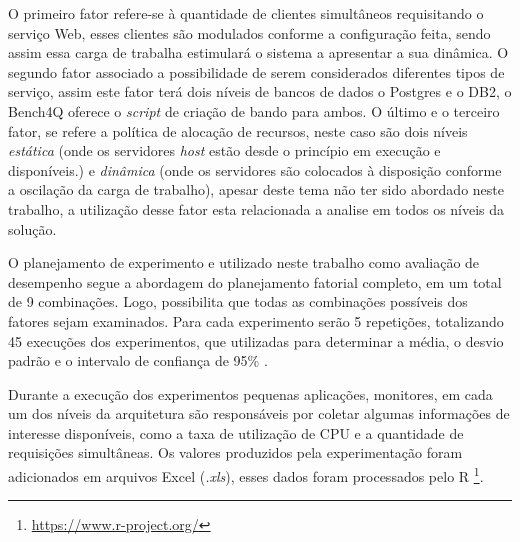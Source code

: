 O primeiro fator refere-se à quantidade de clientes simultâneos requisitando o serviço Web, esses clientes são modulados conforme a configuração feita, sendo assim essa carga de trabalha estimulará o sistema a apresentar a sua dinâmica. O segundo fator associado a possibilidade de serem considerados diferentes tipos de serviço, assim este fator terá dois níveis de bancos de dados o Postgres e o DB2, o Bench4Q oferece o \textit{script} de criação de bando para ambos. O último e o terceiro fator, se refere a política de alocação de recursos, neste caso são dois níveis \textit{estática} (onde os servidores \textit{host} estão desde o princípio em execução e disponíveis.) e \textit{dinâmica} (onde os servidores são colocados à disposição conforme a oscilação da carga de trabalho), apesar deste tema não ter sido abordado neste trabalho, a utilização desse fator esta relacionada a analise em todos os níveis da solução.

O planejamento de experimento e utilizado neste trabalho como avaliação de desempenho segue a abordagem do planejamento fatorial completo, em um total de 9 combinações. Logo, possibilita que todas as combinações possíveis dos fatores sejam examinados. Para cada experimento serão 5 repetições, totalizando 45 execuções dos experimentos, que utilizadas para determinar a média, o desvio padrão e o intervalo de confiança de 95\% .

Durante a execução dos experimentos pequenas aplicações, monitores, em cada um dos níveis da arquitetura são responsáveis por coletar algumas informações de interesse disponíveis, como a taxa de utilização de CPU e a quantidade de requisições simultâneas. Os valores produzidos pela experimentação foram adicionados em arquivos Excel (\textit{.xls}), esses dados foram processados pelo R \footnote{\url{https://www.r-project.org/}}.
